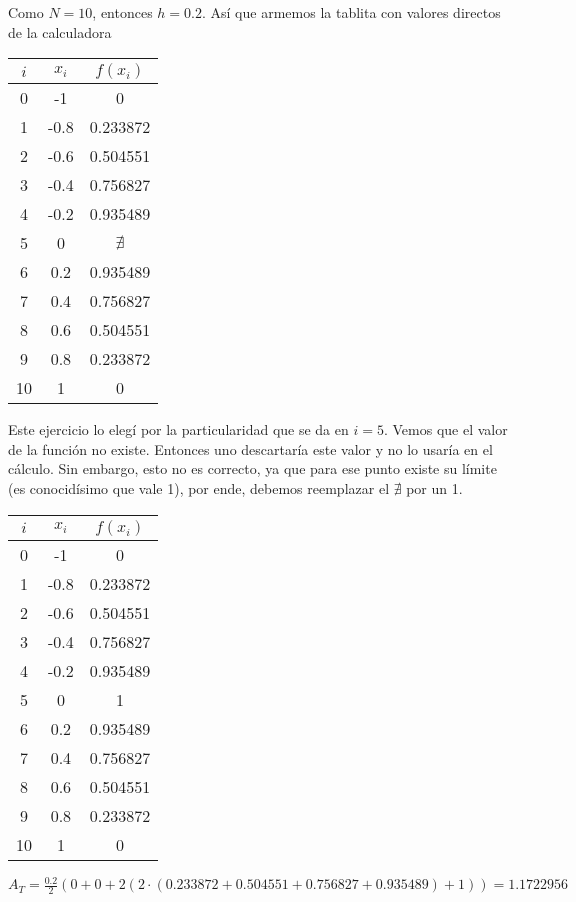 \documentclass[11pt]{article}
\begin{document}
	Como $N=10$, entonces $h=0.2$. Así que armemos la tablita con valores directos de la calculadora
	
	\begin{tabular}{|c|c|c|}
		\hline
		$i$ & $x_i$ & $f(x_i)$ \\
		\hline
		0 & -1 & 0 \\
		\hline
		1 & -0.8 & 0.233872 \\
		\hline
		2 & -0.6 & 0.504551 \\
		\hline
		3 & -0.4 & 0.756827 \\
		\hline
		4 & -0.2 & 0.935489 \\
		\hline
		5 & 0 & $\nexists$ \\
		\hline
		6 & 0.2 & 0.935489 \\
		\hline
		7 & 0.4 & 0.756827 \\
		\hline
		8 & 0.6 & 0.504551 \\
		\hline
		9 & 0.8 & 0.233872 \\
		\hline
		10 & 1 & 0 \\
		\hline
	\end{tabular}

	Este ejercicio lo elegí por la particularidad que se da en $i=5$. Vemos que el valor de la función no existe. Entonces uno descartaría este valor y no lo usaría en el cálculo. Sin embargo, esto no es correcto, ya que para ese punto existe su límite (es conocidísimo que vale 1), por ende, debemos reemplazar el $\nexists$ por un 1.
	
	\begin{tabular}{|c|c|c|}
		\hline
		$i$ & $x_i$ & $f(x_i)$ \\
		\hline
		0 & -1 & 0 \\
		\hline
		1 & -0.8 & 0.233872 \\
		\hline
		2 & -0.6 & 0.504551 \\
		\hline
		3 & -0.4 & 0.756827 \\
		\hline
		4 & -0.2 & 0.935489 \\
		\hline
		5 & 0 & 1 \\
		\hline
		6 & 0.2 & 0.935489 \\
		\hline
		7 & 0.4 & 0.756827 \\
		\hline
		8 & 0.6 & 0.504551 \\
		\hline
		9 & 0.8 & 0.233872 \\
		\hline
		10 & 1 & 0 \\
		\hline
	\end{tabular}

	$\displaystyle A_T=\frac{0.2}{2}(0+0+2(2\cdot(0.233872+0.504551+0.756827+0.935489)+1))=1.1722956$
	
\end{document}
